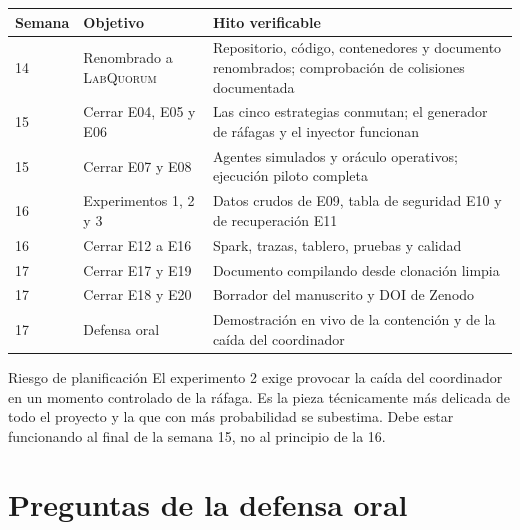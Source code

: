 \documentclass[11pt,a4paper]{article}
\begin{document}
\begin{center}
	\small
	\begin{tabular}{@{}p{1.8cm}p{6.4cm}p{6.6cm}@{}}
		\toprule
		\textbf{Semana} & \textbf{Objetivo} & \textbf{Hito verificable} \\
		\midrule
		14 & Renombrado a \textsc{LabQuorum} & Repositorio, código, contenedores y documento renombrados; comprobación de colisiones documentada \\
		15 & Cerrar E04, E05 y E06 & Las cinco estrategias conmutan; el generador de ráfagas y el inyector funcionan \\
		15 & Cerrar E07 y E08 & Agentes simulados y oráculo operativos; ejecución piloto completa \\
		16 & Experimentos 1, 2 y 3 & Datos crudos de E09, tabla de seguridad E10 y de recuperación E11 \\
		16 & Cerrar E12 a E16 & Spark, trazas, tablero, pruebas y calidad \\
		17 & Cerrar E17 y E19 & Documento compilando desde clonación limpia \\
		17 & Cerrar E18 y E20 & Borrador del manuscrito y DOI de Zenodo \\
		17 & Defensa oral & Demostración en vivo de la contención y de la caída del coordinador \\
		\bottomrule
	\end{tabular}
\end{center}

\begin{alerta}{Riesgo de planificación}
	El experimento 2 exige provocar la caída del coordinador en un momento controlado de la ráfaga. Es la pieza técnicamente más delicada de todo el proyecto y la que con más probabilidad se subestima. Debe estar funcionando al final de la semana 15, no al principio de la 16.
\end{alerta}

\section{Preguntas de la defensa oral}
\end{document}
